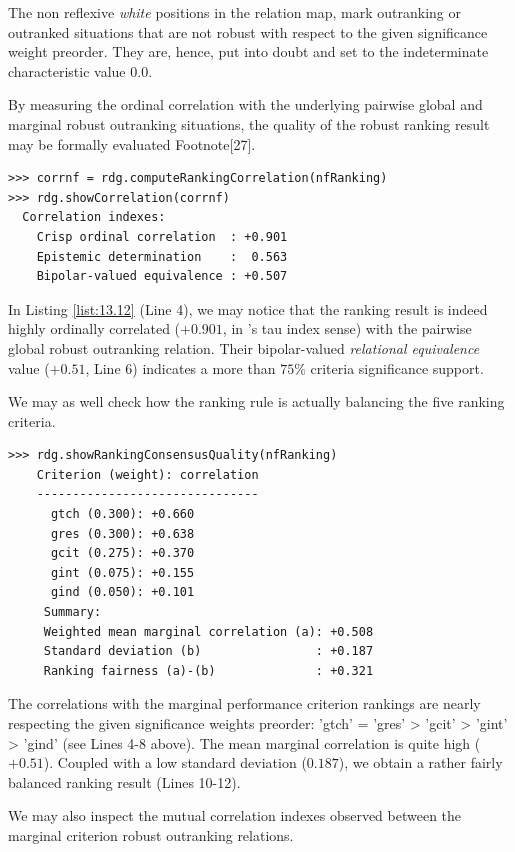 The non reflexive \emph{white} positions in the relation map, mark outranking or outranked situations that are not robust with respect to the given significance weight preorder. They are, hence, put into doubt and set to the indeterminate characteristic value $0.0$.

By measuring the ordinal correlation with the underlying pairwise global and marginal robust outranking situations, the quality of the robust \NetFlows ranking result may be formally evaluated Footnote[27].  

\begin{lstlisting}[caption={Measuring the quality of the \NetFlows ranking result},label=list:13.12]
>>> corrnf = rdg.computeRankingCorrelation(nfRanking)
>>> rdg.showCorrelation(corrnf)   
  Correlation indexes:
    Crisp ordinal correlation  : +0.901
    Epistemic determination    :  0.563
    Bipolar-valued equivalence : +0.507
\end{lstlisting}

In Listing \ref{list:13.12} (Line 4), we may notice that the \NetFlows ranking result is indeed highly ordinally correlated ($+0.901$, in \Kendall 's tau index sense) with the pairwise global robust outranking relation. Their bipolar-valued \emph{relational equivalence}  value ($+0.51$, Line 6) indicates a more than $75\%$ criteria significance support.

We may as well check how the \NetFlows ranking rule is actually balancing the five ranking criteria.

\begin{lstlisting}
>>> rdg.showRankingConsensusQuality(nfRanking)
    Criterion (weight): correlation
    -------------------------------
      gtch (0.300): +0.660
      gres (0.300): +0.638
      gcit (0.275): +0.370
      gint (0.075): +0.155
      gind (0.050): +0.101
     Summary:
     Weighted mean marginal correlation (a): +0.508
     Standard deviation (b)                : +0.187
     Ranking fairness (a)-(b)              : +0.321
\end{lstlisting}

The correlations with the marginal performance criterion rankings are nearly respecting the given significance weights preorder: 'gtch' = 'gres' > 'gcit' > 'gint' > 'gind' (see Lines 4-8 above). The mean marginal correlation is quite high ($+0.51$). Coupled with a low standard deviation ($0.187$), we obtain a rather fairly balanced ranking result (Lines 10-12). 

We may also inspect the mutual correlation indexes observed between the marginal criterion robust outranking relations. 

